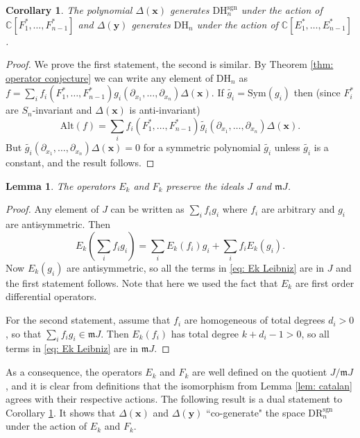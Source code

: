 \documentclass{amsart}
\newcommand{\C}{\mathbb{C}}
\newcommand{\xx}{\mathbf{x}}
\newcommand{\yy}{\mathbf{y}}
\newcommand{\mm}{\mathfrak{m}}
\newcommand{\DR}{\mathrm{DR}}
\newcommand{\Alt}{\mathrm{Alt}}
\newcommand{\Sym}{\mathrm{Sym}}
\renewcommand{\DH}{\mathrm{DH}}
\newcommand{\sgn}{\mathrm{sgn}}
\numberwithin{equation}{section}
\newtheorem{corollary}[theorem]{Corollary}
\newtheorem{lemma}[theorem]{Lemma}
\theoremstyle{definition}
\begin{document}
\begin{corollary}
\label{cor: operator conjecture sgn}
The polynomial $\Delta(\xx)$ generates  $\DH_n^{\sgn}$ under the action of $\C[F^*_1,\ldots,F_{n-1}^*]$ and 
$\Delta(\yy)$ generates $\DH_n$ under the action of $\C[E_1^*,\ldots,E_{n-1}^*]$. 
\end{corollary}

\begin{proof}
We prove the first statement, the second is similar. By Theorem \ref{thm: operator conjecture} we can write any element of $\DH_n$ as $f=\sum_i f_i(F^*_1,\ldots,F_{n-1}^*)g_i(\partial_{x_1},\ldots,\partial_{x_n})\Delta(\xx)$. If $\widetilde{g_i}=\Sym(g_i)$ then (since $F_i^*$ are $S_n$-invariant and $\Delta(\xx)$ is anti-invariant)
$$
\Alt(f)=\sum_i f_i(F^*_1,\ldots,F_{n-1}^*)\widetilde{g_i}(\partial_{x_1},\ldots,\partial_{x_n})\Delta(\xx).
$$
But $\widetilde{g_i}(\partial_{x_1},\ldots,\partial_{x_n})\Delta(\xx)=0$ for a symmetric polynomial $\widetilde{g_i}$ unless $\widetilde{g_i}$ is a constant, and the result follows.
\end{proof}

\begin{lemma}
\label{lem: Ek Fk preserve}
The operators $E_k$ and $F_k$ preserve the ideals $J$ and $\mm J$. 
\end{lemma}

\begin{proof}
Any element of $J$ can be written as $\sum_i f_ig_i$ where $f_i$ are arbitrary and $g_i$ are antisymmetric. Then
\begin{equation}
\label{eq: Ek Leibniz}
E_k\left(\sum_i f_ig_i\right)=\sum_i E_k(f_i)g_i+\sum_i f_iE_k(g_i).
\end{equation}
Now $E_k(g_i)$ are antisymmetric, so all the terms in \eqref{eq: Ek Leibniz} are in $J$ and the first statement follows. Note that here we used the fact that $E_k$ are first order differential operators.

For the second statement, assume that $f_i$ are homogeneous of total degrees $d_i>0$, so that $\sum_i f_ig_i\in \mm J$. Then $E_k(f_i)$ has total degree $k+d_i-1>0$, so all terms in \eqref{eq: Ek Leibniz} are in $\mm J$.
\end{proof}

As a consequence, the operators $E_k$ and $F_k$ are well defined on the quotient $J/\mm J$, and it is clear from definitions that the isomorphism from Lemma \ref{lem: catalan} agrees with their respective actions.
The following result is a dual statement to Corollary \ref{cor: operator conjecture sgn}. It shows that $\Delta(\xx)$ and $\Delta(\yy)$ ``co-generate" the space $\DR_n^{\sgn}$ under the action of $E_k$ and $F_k$.
\end{document}
